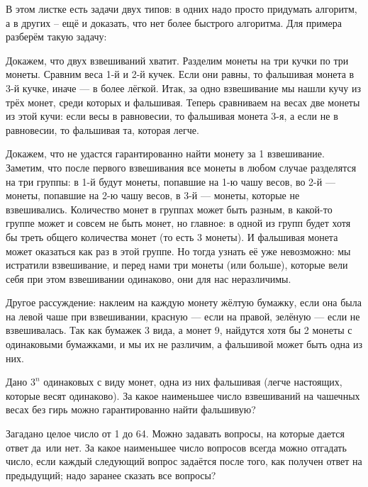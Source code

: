 \documentclass[12pt,a4paper]{article}
\begin{document}

{\small В этом листке есть задачи двух типов: в одних надо просто придумать алгоритм, а в других -- ещё и доказать,
что нет более быстрого алгоритма. Для примера разберём такую задачу:


Докажем, что двух взвешиваний хватит. Разделим монеты на три кучки
по три монеты. Сравним веса 1-й и 2-й кучек.
Если они равны, то фальшивая монета в 3-й кучке, иначе --- в более
лёгкой. Итак, за одно взвешивание мы нашли кучу из трёх монет,
среди которых и фальшивая. Теперь сравниваем
на весах две монеты из этой кучи: если весы в равновесии, то фальшивая монета 3-я,
а если не в равновесии, то фальшивая та, которая легче.

Докажем, что не удастся гарантированно найти монету за 1 взвешивание.
Заметим, что после первого взвешивания все монеты в любом случае разделятся на три группы: в 1-й
будут монеты, попавшие на 1-ю чашу весов, во 2-й --- монеты,
попавшие на 2-ю чашу весов, в 3-й --- монеты, которые не
взвешивались. Количество монет в группах может быть разным,
в какой-то группе может и совсем не быть монет, но главное: в одной из групп будет хотя бы
треть общего количества монет (то есть 3 монеты). И фальшивая монета
может оказаться как раз в этой группе. Но тогда узнать её уже невозможно:
мы истратили взвешивание, и перед нами три монеты (или больше),
которые вели себя при этом взвешивании одинаково, они для нас неразличимы.

Другое рассуждение: наклеим на каждую монету жёлтую бумажку, если она была на левой чаше при взвешивании,
красную --- если на правой, зелёную --- если не взвешивалась. Так как бумажек 3 вида, а монет 9, найдутся хотя бы 2 монеты с одинаковыми бумажками, и мы их не различим, а фальшивой может быть одна из них.

}


Дано $3^n$ одинаковых с виду монет, одна из них фальшивая (легче настоящих, которые весят одинаково).
За какое наименьшее число взвешиваний на чашечных весах без гирь можно гарантированно найти фальшивую?

Загадано целое число от 1 до 64. Можно задавать вопросы,
на которые дается ответ  да\ или  нет. За какое наименьшее число
вопросов всегда можно отгадать число, если
каждый следующий вопрос задаётся после того, как
получен ответ на предыдущий;
надо заранее сказать все вопросы?
\end{document}

